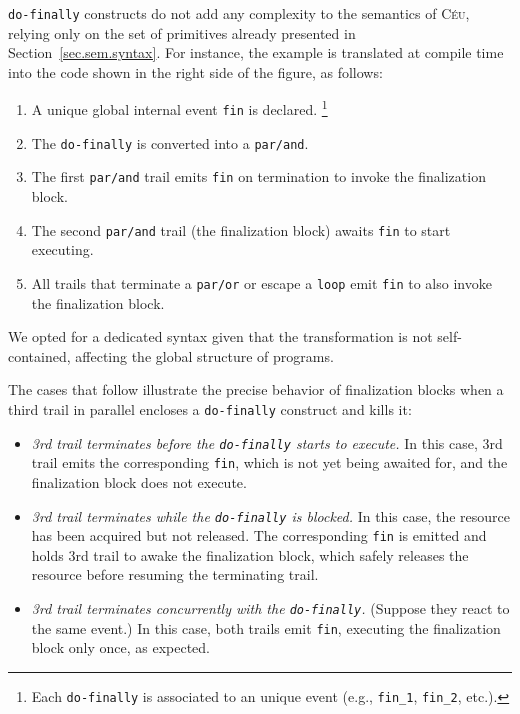 \documentclass[preprint]{sigplanconf}
\newcommand{\CEU}{\textsc{C\'{e}u}\xspace}
\newcommand{\code}[1] {{\small{\texttt{#1}}}}
\newcommand{\DOFIN}{\code{do-finally}\xspace}
\newcommand{\1}{\;}
\newcommand{\2}{\;\;}
\newcommand{\3}{\;\;\;}
\newcommand{\5}{\;\;\;\;\;}
\begin{document}
\DOFIN constructs do not add any complexity to the semantics of \CEU, relying 
only on the set of primitives already presented in 
Section~\ref{sec.sem.syntax}.
For instance, the example is translated at compile time into the code shown in 
the right side of the figure, as follows:

\begin{enumerate}
\item A unique global internal event \code{fin} is declared.%
\footnote{Each \DOFIN is associated to an unique event (e.g.,  \code{fin\_1}, 
\code{fin\_2}, etc.).}
\item The \DOFIN is converted into a \code{par/and}.
\item The first \code{par/and} trail emits \code{fin} on termination to invoke 
the finalization block.
\item The second \code{par/and} trail (the finalization block) awaits 
\code{fin} to start executing.
\item All trails that terminate a \code{par/or} or escape a \code{loop} emit 
\code{fin} to also invoke the finalization block.
\end{enumerate}

We opted for a dedicated syntax given that the transformation is not 
self-contained, affecting the global structure of programs.

The cases that follow illustrate the precise behavior of finalization blocks 
when a third trail in parallel encloses a \DOFIN construct and kills it:

\begin{itemize}
\item \emph{3rd trail terminates before the \DOFIN starts to execute.}
In this case, 3rd trail emits the corresponding \code{fin}, which is not yet 
being awaited for, and the finalization block does not execute.
\item \emph{3rd trail terminates while the \DOFIN is blocked.}
In this case, the resource has been acquired but not released.
The corresponding \code{fin} is emitted and holds 3rd trail to awake the 
finalization block, which safely releases the resource before resuming the 
terminating trail.
\item \emph{3rd trail terminates concurrently with the \DOFIN.} (Suppose they 
react to the same event.)
In this case, both trails emit \code{fin}, executing the finalization block 
only once, as expected.
\end{itemize}
\end{document}
